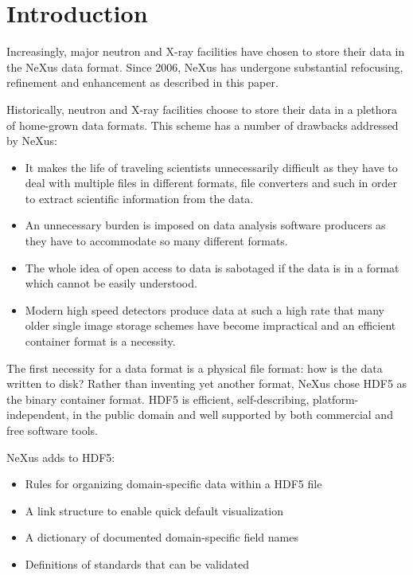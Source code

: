 \documentclass[%
 aip,
rsi,
 amsmath,amssymb,
 reprint,%
]{revtex4-1}
\begin{document}
\maketitle


\section{Introduction}
Increasingly, major neutron and X-ray facilities have chosen to store their data in the NeXus data format. 
Since 2006, NeXus\cite{nxold} has undergone substantial refocusing, 
refinement and enhancement as described in this paper.  

Historically, neutron and X-ray facilities choose to store their data in a plethora of 
home-grown data formats. This scheme has a number of drawbacks addressed by NeXus: 
\begin{itemize}
\item It makes the life of traveling scientists unnecessarily difficult as they have to deal with multiple files 
 in different formats, file converters and such in order to extract scientific information from the data.
 \item An unnecessary burden is imposed on data analysis software producers as they have to accommodate so many different formats.  
\item The whole idea of open access to data is sabotaged if the data is in a format which cannot be easily understood.
\item Modern high speed detectors produce data at such a high rate that many older single image storage schemes 
 have become impractical and 
 an efficient container format is a necessity. 
\end{itemize}

The first necessity for a data format is a physical file format: how is the data written to disk? Rather than inventing  
yet another format, NeXus chose HDF5\cite{hdf5} as the binary container format. HDF5 is efficient, self-describing, 
platform-independent, in the public domain and well supported by both commercial and free software tools. 

NeXus adds to HDF5:
\begin{itemize}
\item Rules for organizing domain-specific data within a HDF5 file
\item A link structure to enable quick default visualization
\item A dictionary of documented domain-specific field names
\item Definitions of standards that can be validated
\end{itemize}
\end{document}
